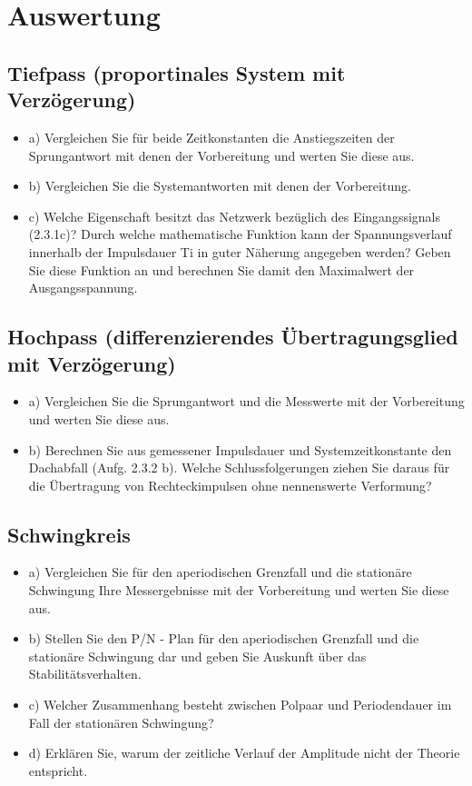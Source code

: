 \section{Auswertung}


\subsection{Tiefpass (proportinales System mit Verzögerung)}

\begin{itemize}
\item a) Vergleichen  Sie  für  beide  Zeitkonstanten die  Anstiegszeiten der Sprungantwort mit denen der Vorbereitung und werten Sie diese aus. 
\item b) Vergleichen Sie die Systemantworten mit denen der Vorbereitung. 
\item c) Welche Eigenschaft besitzt das Netzwerk bezüglich des Eingangssignals (2.3.1c)? Durch welche mathematische Funktion kann der Spannungsverlauf 
innerhalb der Impulsdauer Ti in guter Näherung angegeben werden? Geben Sie diese Funktion an und berechnen Sie damit den Maximalwert der Ausgangsspannung. 
\end{itemize}

\subsection{Hochpass (differenzierendes Übertragungsglied mit Verzögerung)}

\begin{itemize}
\item a) Vergleichen Sie die Sprungantwort und die Messwerte mit der Vorbereitung und werten Sie diese aus.
\item b) Berechnen Sie aus gemessener Impulsdauer und Systemzeitkonstante den Dachabfall (Aufg. 2.3.2 b). Welche Schlussfolgerungen ziehen 
Sie daraus für die Übertragung von Rechteckimpulsen ohne nennenswerte Verformung?
\end{itemize}

\subsection{Schwingkreis}

\begin{itemize}
\item a) Vergleichen Sie für den aperiodischen Grenzfall und die stationäre Schwingung Ihre Messergebnisse mit der Vorbereitung und werten Sie diese aus. 
\item b) Stellen Sie den P/N - Plan für den aperiodischen Grenzfall und die stationäre Schwingung dar und geben Sie Auskunft über das Stabilitätsverhalten. 
\item c) Welcher Zusammenhang besteht zwischen Polpaar und Periodendauer im Fall der stationären Schwingung? 
\item d) Erklären Sie, warum der zeitliche Verlauf der Amplitude nicht der Theorie entspricht. 
\end{itemize}

